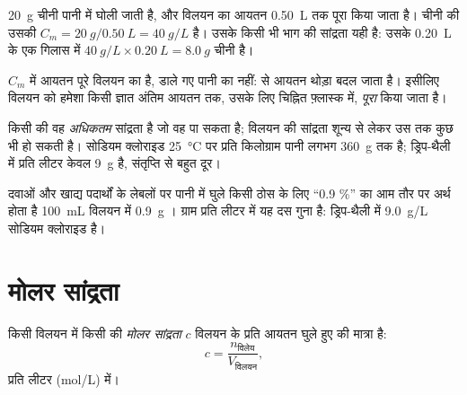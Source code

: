 \begin{example}[चीनी वाला पानी]\label{ex:g10:concentration-and-dilution:sugar}
\qty{20}{g} चीनी पानी में घोली जाती है, और विलयन का आयतन \qty{0.50}{L} तक
पूरा किया जाता है। चीनी की उसकी 
$C_m = \qty{20}{g} / \qty{0.50}{L} = \qty{40}{g/L}$ है। उसके किसी भी भाग की
सांद्रता यही है: उसके \qty{0.20}{L} के एक गिलास में
$\qty{40}{g/L} \times \qty{0.20}{L} = \qty{8.0}{g}$ चीनी है।
\end{example}


\begin{remark}\label{rem:g10:concentration-and-dilution:volume}
$C_m$ में आयतन पूरे विलयन का है, डाले गए पानी का नहीं:   से आयतन
थोड़ा बदल जाता है। इसीलिए विलयन को हमेशा किसी ज्ञात अंतिम आयतन तक, उसके लिए
चिह्नित फ़्लास्क में, \emph{पूरा} किया जाता है।
\end{remark}

\begin{remark}[सांद्रता विलेयता नहीं है]\label{rem:g10:concentration-and-dilution:not-solubility}
किसी  की  वह \emph{अधिकतम} सांद्रता है जो वह पा सकता है; विलयन की
सांद्रता शून्य से लेकर उस तक कुछ भी हो सकती है। सोडियम
क्लोराइड \qty{25}{\celsius} पर प्रति किलोग्राम पानी लगभग \qty{360}{g} तक 
है; ड्रिप-थैली में प्रति लीटर केवल \qty{9}{g} है, संतृप्ति से
बहुत दूर।
\end{remark}

\begin{remark}[लेबलों पर प्रतिशत]\label{rem:g10:concentration-and-dilution:percent}
दवाओं और खाद्य पदार्थों के लेबलों पर पानी में घुले किसी ठोस के लिए ``0.9 \%''
का आम तौर पर अर्थ होता है \qty{100}{mL} विलयन में \qty{0.9}{g} ।
ग्राम प्रति लीटर में यह दस गुना है: ड्रिप-थैली में \qty{9.0}{g/L}
सोडियम क्लोराइड है।
\end{remark}

\section{मोलर सांद्रता}

\begin{definition}[मोलर सांद्रता]\label{def:g10:concentration-and-dilution:molar-concentration}
किसी विलयन में किसी  की \emph{मोलर सांद्रता} $c$
विलयन के प्रति आयतन घुले हुए  की मात्रा
है:
\[
  c = \frac{n_{\text{विलेय}}}{V_{\text{विलयन}}},
\]
 प्रति लीटर (\si{mol/L}) में।
\end{definition}

